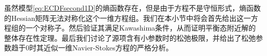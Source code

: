 % 

虽然模型\eqref{eq:ECDFsecond1D}的熵函数存在，但是由于方程不是守恒形式，熵函数的Hessian矩阵无法对称化这个一维方程组。我们在本小节中将会首先给出这一方程组的一个对称子。然后验证其满足Kawashima条件，从而证明平衡态附近解的整体存在性定理。最后我们讨论了源项含有小参数时的松弛极限，并给出了松弛参数趋于0时其近似一维Navier-Stokes方程的严格分析。

